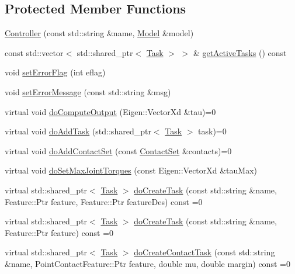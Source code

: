 \subsection*{Protected Member Functions}
\begin{DoxyCompactItemize}
\item 
\hyperlink{classocra_1_1Controller_a9f72394baa089119cf0b60e3c7160283}{Controller} (const std\+::string \&name, \hyperlink{classocra_1_1Model}{Model} \&model)
\item 
const std\+::vector$<$ std\+::shared\+\_\+ptr$<$ \hyperlink{classocra_1_1Task}{Task} $>$ $>$ \& \hyperlink{classocra_1_1Controller_ae6bd140019ee47ec247f49efff7a8a32}{get\+Active\+Tasks} () const 
\item 
void \hyperlink{classocra_1_1Controller_a36df4135749c17f6d4425fabed37d022}{set\+Error\+Flag} (int eflag)
\item 
void \hyperlink{classocra_1_1Controller_a3e8c327d25152d457172a65d826c84b4}{set\+Error\+Message} (const std\+::string \&msg)
\item 
virtual void \hyperlink{classocra_1_1Controller_a8ca85413067d948459afa5981b3dda32}{do\+Compute\+Output} (Eigen\+::\+Vector\+Xd \&tau)=0
\item 
virtual void \hyperlink{classocra_1_1Controller_ab3477822a9363553c99eefa58ff803eb}{do\+Add\+Task} (std\+::shared\+\_\+ptr$<$ \hyperlink{classocra_1_1Task}{Task} $>$ task)=0
\item 
virtual void \hyperlink{classocra_1_1Controller_acb11edc1ceaa89423c1e58f9cb38a9f7}{do\+Add\+Contact\+Set} (const \hyperlink{classocra_1_1ContactSet}{Contact\+Set} \&contacts)=0
\item 
virtual void \hyperlink{classocra_1_1Controller_a75d6419229980f6088a689fcafc1d224}{do\+Set\+Max\+Joint\+Torques} (const Eigen\+::\+Vector\+Xd \&tau\+Max)
\item 
virtual std\+::shared\+\_\+ptr$<$ \hyperlink{classocra_1_1Task}{Task} $>$ \hyperlink{classocra_1_1Controller_a05f6d757e4125a71bf766df7f069ac43}{do\+Create\+Task} (const std\+::string \&name, Feature\+::\+Ptr feature, Feature\+::\+Ptr feature\+Des) const =0
\item 
virtual std\+::shared\+\_\+ptr$<$ \hyperlink{classocra_1_1Task}{Task} $>$ \hyperlink{classocra_1_1Controller_a358a31c0b6b6bdcc0e6da5c49eb9fde5}{do\+Create\+Task} (const std\+::string \&name, Feature\+::\+Ptr feature) const =0
\item 
virtual std\+::shared\+\_\+ptr$<$ \hyperlink{classocra_1_1Task}{Task} $>$ \hyperlink{classocra_1_1Controller_a823933d261a12aac49f8a0ef56823ea4}{do\+Create\+Contact\+Task} (const std\+::string \&name, Point\+Contact\+Feature\+::\+Ptr feature, double mu, double margin) const =0
\end{DoxyCompactItemize}
